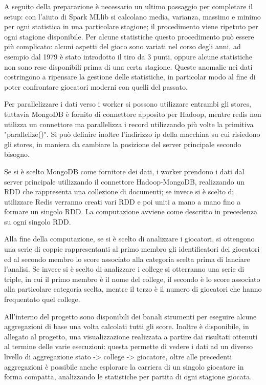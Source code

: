 \documentclass[10pt,a4paper,twocolumn]{article}
\begin{document}
A seguito della preparazione è necessario un ultimo passaggio per completare il setup: con l'aiuto di Spark MLlib si calcolano media, varianza, massimo e minimo per ogni statistica in una particolare stagione; il procedimento viene ripetuto per ogni stagione disponibile. Per alcune statistiche questo procedimento può essere più complicato: alcuni aspetti del gioco sono variati nel corso degli anni, ad esempio dal 1979 è stato introdotto il tiro da 3 punti, oppure alcune statistiche non sono rese disponibili prima di una certa stagione. Queste anomalie nei dati costringono a ripensare la gestione delle statistiche, in particolar modo al fine di poter confrontare giocatori moderni con quelli del passato.

Per parallelizzare i dati verso i worker si possono utilizzare entrambi gli stores, tuttavia MongoDB è fornito di connettore apposito per Hadoop, mentre redis non utilizza un connettore ma parallelizza i record utilizzando più volte la primitiva "parallelize()". Si può definire inoltre l'indirizzo ip della macchina su cui risiedono gli stores, in maniera da cambiare la posizione del server principale secondo bisogno.

Se si è scelto MongoDB come fornitore dei dati, i worker prendono i dati dal server principale utilizzando il connettore Hadoop-MongoDB, realizzando un RDD che rappresenta una collezione di documenti;  se invece si è scelto di utilizzare Redis verranno creati vari RDD e poi uniti a mano a mano fino a formare un singolo RDD. La computazione avviene come descritto in precedenza su ogni singolo RDD.

Alla fine della computazione, se si è scelto di analizzare i giocatori, si ottengono una serie di coppie rappresentanti al primo membro gli identificatori dei giocatori ed al secondo membro lo score associato alla categoria scelta prima di lanciare l'analisi. Se invece si è scelto di analizzare i college si otterranno una serie di triple, in cui il primo membro è il nome del college, il secondo è lo score associato alla particolare categoria scelta, mentre il terzo è il numero di giocatori che hanno frequentato quel college.

All'interno del progetto sono disponibili dei banali strumenti per eseguire alcune aggregazioni di base una volta calcolati tutti gli score. Inoltre è disponibile, in allegato al progetto, una visualizzazione realizzata a partire dai risultati ottenuti al termine delle varie esecuzioni: questa permette di vedere i dati ad un diverso livello di aggregazione stato -> college -> giocatore, oltre alle precedenti aggregazioni è possibile anche esplorare la carriera di un singolo giocatore in forma compatta, analizzando le statistiche per partita di ogni stagione giocata.
\end{document}
